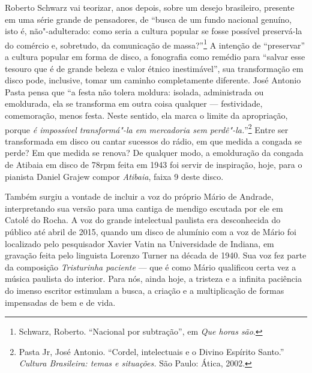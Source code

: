 Roberto Schwarz vai teorizar, anos depois, sobre um desejo brasileiro,
presente em uma série grande de pensadores, de ``busca de um fundo
nacional genuíno, isto é, não"-adulterado: como seria a cultura popular
se fosse possível preservá-la do comércio e, sobretudo, da comunicação
de massa?''\footnote{Schwarz, Roberto. ``Nacional por subtração'', em
  \emph{Que horas são}.} A intenção de ``preservar'' a cultura popular
em forma de disco, a fonografia como remédio para ``salvar esse tesouro
que é de grande beleza e valor étnico inestimável'', sua transformação
em disco pode, inclusive, tomar um caminho completamente diferente. José
Antonio Pasta pensa que ``a festa não tolera moldura: isolada,
administrada ou emoldurada, ela se transforma em outra coisa qualquer ---
festividade, comemoração, menos festa. Neste sentido, ela marca o limite
da apropriação, porque \emph{é impossível transformá"-la em mercadoria
sem perdê"-la.}''\footnote{Pasta Jr, José Antonio. ``Cordel, intelectuais
  e o Divino Espírito Santo.'' \emph{Cultura Brasileira: temas e
  situações.} São Paulo: Ática, 2002.} Entre ser transformada em disco
ou cantar sucessos do rádio, em que medida a congada se perde? Em que
medida se renova? De qualquer modo, a emolduração da congada de Atibaia
em disco de 78rpm feita em 1943 foi servir de inspiração, hoje, para o
pianista Daniel Grajew compor \emph{Atibaia}, faixa 9 deste disco.

Também surgiu a vontade de incluir a voz do próprio Mário de Andrade,
interpretando sua versão para uma cantiga de mendigo escutada por ele em
Catolé do Rocha. A voz do grande intelectual paulista era desconhecida
do público até abril de 2015, quando um disco de alumínio com a voz de
Mário foi localizado pelo pesquisador Xavier Vatin na Universidade de
Indiana, em gravação feita pelo linguista Lorenzo Turner na década de
1940. Sua voz fez parte da composição \emph{Tristurinha paciente} --- que
é como Mário qualificou certa vez a música paulista do interior. Para
nós, ainda hoje, a tristeza e a infinita paciência do imenso escritor
estimulam a busca, a criação e a multiplicação de formas impensadas de 
bem e de vida.

\pagebreak

